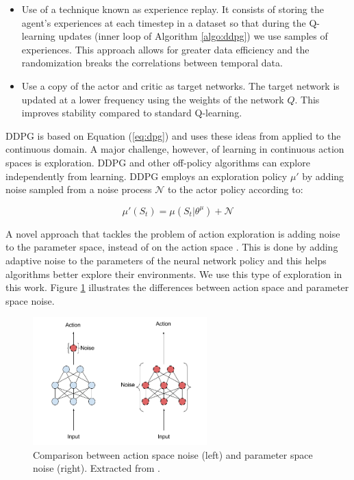 \begin{itemize}
    \item Use of a technique known as experience replay. It consists of storing the agent's experiences at each timestep in a 
    dataset so that during the Q-learning updates (inner loop of Algorithm \ref{algo:ddpg}) we use samples of experiences.
    This approach allows for greater data efficiency and the randomization breaks the correlations between temporal data.
    \item Use a copy of the actor and critic as target networks. The target network is updated at a lower frequency
    using the weights of the network $Q$. This improves stability compared to standard Q-learning.
\end{itemize}

DDPG is based on Equation (\ref{eq:dpg}) and uses these ideas from \cite{RLNature2015} applied to the continuous domain.
A major challenge, however, of learning in continuous action spaces is exploration. DDPG and other off-policy algorithms
can explore independently from learning. DDPG employs an exploration policy $\mu'$ by adding noise sampled from a noise process
$\mathcal{N}$ to the actor policy according to:

\begin{equation}
    \mu'(S_t) = \mu(S_t \vert \theta^\mu) + \mathcal{N}
\end{equation}

A novel approach that tackles the problem of action exploration is adding noise to the parameter space,
instead of on the action space \cite{OpenAIParameterNoise}. This is done by adding adaptive noise to
the parameters of the neural network policy and this helps algorithms better explore their environments.
We use this type of exploration in this work.
Figure \ref{fig:parameter_noise} illustrates the differences between action space and parameter space noise.

\begin{figure}[thb]
    \centering
    \includegraphics[width=0.6\textwidth]{Chapter4/parameter_noise.png}
    \caption{Comparison between action space noise (left) and parameter space noise (right).
    Extracted from \cite{OpenAIParameterNoise}.}
    \label{fig:parameter_noise}
\end{figure}

